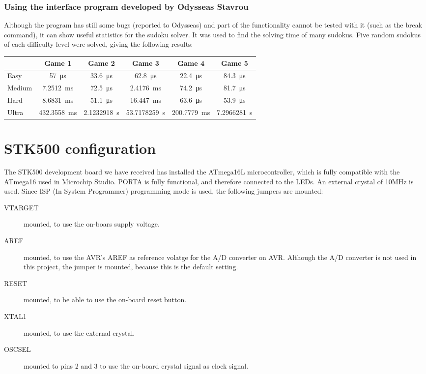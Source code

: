 \documentclass[12pt, a4]{article}
\begin{document}
\subsubsection*{Using the interface program developed by Odysseas Stavrou}
Although the program has still some bugs (reported to Odysseas) and part of the functionality cannot be tested with it (such as the break command), it can show useful statistics for the sudoku solver. It was used to find the solving time of many sudokus. Five random sudokus of each difficulty level were solved, giving the following results:
\begin{center}
\begin{tabular}{ |l|c|c|c|c|c| } 
 \hline
              & Game 1  & Game 2 & Game 3 & Game 4 & Game 5 \\  \hline
 Easy      &  \SI{57}{\micro\second}  &   \SI{33.6}{\micro\second}   & \SI{62.8}{\micro\second}  &\SI{22.4}{\micro\second}     &\SI{84.3}{\micro\second} \\  \hline
 Medium &   \SI{7.2512}{\milli\second}  &   \SI{72.5}{\micro\second}   & \SI{2.4176}{\milli\second}    & \SI{74.2}{\micro\second}  &\SI{81.7}{\micro\second}  \\  \hline
 Hard     &   \SI{8.6831}{\milli\second}    &    \SI{51.1}{\micro\second}  & \SI{16.447}{\milli\second}   & \SI{63.6}{\micro\second}  & \SI{53.9}{\micro\second}    \\  \hline
 Ultra     &  \SI{432.3558}{\milli\second}   &    \SI{2.1232918}{\second}   & \SI{53.7178259}{\second}  & \SI{200.7779}{\milli\second}   & \SI{7.2966281}{\second}    \\  \hline
\end{tabular}
\end{center}


\section*{STK500 configuration}
The STK500 development board we have received has installed the ATmega16L microcontroller, which is fully compatible with the ATmega16 used in Microchip Studio. PORTA is fully functional, and therefore connected to the LEDs. An external crystal of 10MHz is used. Since ISP (In System Programmer) programming mode is used, the following jumpers are mounted:
\begin{description}
\item[VTARGET] mounted, to use the on-boars supply voltage.
\item[AREF] mounted, to use the AVR's AREF as reference volatge for the A/D converter on AVR. Although the A/D converter is not used in this project, the jumper is mounted, because this is the default setting.
\item[RESET] mounted, to be able to use the on-board reset button.
\item[XTAL1] mounted, to use the external crystal.
\item[OSCSEL] mounted to pins 2 and 3 to use the on-board crystal signal as clock signal.
\end{description}
\end{document}
